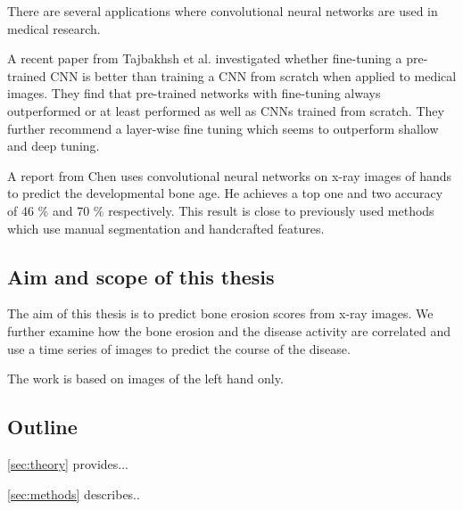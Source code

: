 \documentclass[12pt]{article}
\begin{document}

There are several applications where convolutional neural networks are used in medical research.

A recent paper from Tajbakhsh et al. \cite{tajbakhsh_2017} investigated whether fine-tuning a pre-trained CNN is better than training a CNN from scratch when applied to medical images. They find that pre-trained networks with fine-tuning always outperformed or at least performed as well as CNNs trained from scratch. They further recommend a layer-wise fine tuning which seems to outperform shallow and deep tuning.

A report from Chen \cite{chen_2016} uses convolutional neural networks on x-ray images of hands to predict the developmental bone age. He achieves a top one and two accuracy of 46 \% and 70 \% respectively. This result is close to previously used methods which use manual segmentation and handcrafted features.






\subsection{Aim and scope of this thesis}

The aim of this thesis is to predict bone erosion scores from x-ray images. We further examine how the bone erosion and the disease activity are correlated and use a time series of images to predict the course of the disease.

The work is based on images of the left hand only. 



\subsection{Outline}

\autoref{sec:theory} provides...

\noindent\autoref{sec:methods} describes..

\end{document}
